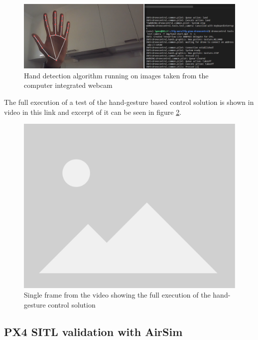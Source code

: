 \begin{figure}
  \centering
  \includegraphics[width=\textwidth, keepaspectratio]{img/sitl-hand-2.png}
  \caption{Hand detection algorithm running on images taken from the computer integrated webcam}\label{fig:sitl-hand}
\end{figure}

The full execution of a test of the hand-gesture based control solution is shown in video in this link and excerpt of it can be seen in figure \ref{fig:sitl-hand-video}.

\begin{figure}
  \centering
  \includegraphics[width=.6\textwidth, keepaspectratio]{img/placeholder.png}
  \caption{Single frame from the video showing the full execution of the hand-gesture control solution}\label{fig:sitl-hand-video}
\end{figure}


\subsection{PX4 SITL validation with AirSim}
\label{sec:test-3-airsim}

